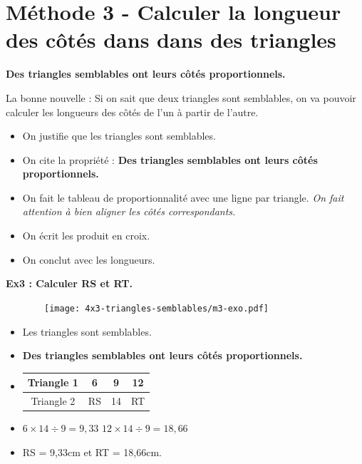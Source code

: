 \newpage
\section*{Méthode 3 - Calculer la longueur des côtés dans dans des triangles}

\textbf{Des triangles semblables ont leurs côtés proportionnels.}

La bonne nouvelle : Si on sait que deux triangles sont semblables, on va pouvoir calculer les longueurs des côtés de l'un à partir de l'autre. 

\begin{itemize}
  \item On justifie que les triangles sont semblables.
  \item On cite la propriété : \textbf{Des triangles semblables ont leurs côtés proportionnels.} 
  \item On fait le tableau de proportionnalité avec une ligne par triangle. \textit{On fait attention à bien aligner les côtés correspondants.}
  \item On écrit les produit en croix. 
  \item On conclut avec les longueurs. 
\end{itemize}

\horrule{1px}
\textbf{Ex3 : Calculer RS et RT.}

\begin{multicols}{2}

  \begin{figure}[H]
    \centering
    \texttt{[image: 4x3-triangles-semblables/m3-exo.pdf]}
  \end{figure}
  \columnbreak

  \begin{itemize}
    \item Les triangles sont semblables.
    \item \textbf{Des triangles semblables ont leurs côtés proportionnels.} 
    \item     
    \begin{tabular}{|c|c|c|c|}
      \hline
      Triangle 1 & 6 & 9 & 12 \\  \hline
      Triangle 2 & RS & 14 & RT\\  \hline
    \end{tabular}
    \item $6  \times 14 \div 9 = 9,33$ \newline
          $12 \times 14 \div 9 = 18,66$
    \item RS = 9,33cm et RT = 18,66cm.
  \end{itemize}

\end{multicols}

